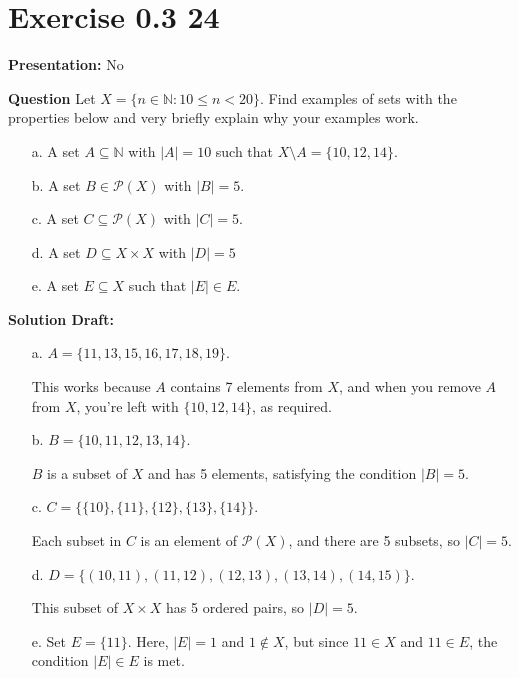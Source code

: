 \documentclass{article}
\begin{document}
\section*{Exercise 0.3 24}  

\noindent\textbf{Presentation:} No

\vspace{0.5cm} %

\noindent\textbf{Question}
Let \( X = \{n \in \mathbb{N} : 10 \leq n < 20\} \). Find examples of sets with the properties below and very briefly explain why your examples work.

\begin{enumerate}
    \item[a.] A set \( A \subseteq \mathbb{N} \) with \( |A| = 10 \) such that \( X \setminus A = \{10, 12, 14\} \).
    \item[b.] A set \( B \in \mathcal{P}(X) \) with \( |B| = 5 \).
    \item[c.] A set \( C \subseteq \mathcal{P}(X) \) with \( |C| = 5 \).
    \item[d.] A set \( D \subseteq X \times X \) with \( |D| = 5 \)
    \item[e.] A set \( E \subseteq X \) such that \( |E| \in E \).
\end{enumerate}

\noindent\textbf{Solution Draft:} 

\begin{enumerate}
    \item[a.] \( A = \{11, 13, 15, 16, 17, 18, 19\} \). 
    
    This works because \( A \) contains 7 elements from \( X \), and when you remove \( A \) from \( X \), you're left with \( \{10, 12, 14\} \), as required.

    \item[b.] \( B = \{10, 11, 12, 13, 14\} \). 
    
    \( B \) is a subset of \( X \) and has 5 elements, satisfying the condition \( |B| = 5 \).

    \item[c.] \( C = \{\{10\}, \{11\}, \{12\}, \{13\}, \{14\}\} \). 
    
    Each subset in \( C \) is an element of \( \mathcal{P}(X) \), and there are 5 subsets, so \( |C| = 5 \).

    \item[d.] \( D = \{(10,11), (11,12), (12,13), (13,14), (14,15)\} \). 
    
    This subset of \( X \times X \) has 5 ordered pairs, so \( |D| = 5 \).

    
    \item[e.] Set \( E = \{11\} \). Here, \( |E| = 1 \) and \( 1 \notin X \), but since \( 11 \in X \) and \( 11 \in E \), the condition \( |E| \in E \) is met.
\end{enumerate}
\end{document}
